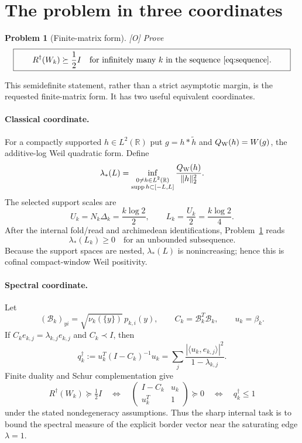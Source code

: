 \documentclass[11pt]{article}
\newtheorem{problem}{Problem}
\newcommand{\R}{\mathbb R}
\newcommand{\Rd}{R^{\dagger}}
\newcommand{\half}{\tfrac12}
\newcommand{\Ograde}{\textnormal{\small[O]}}
\begin{document}
\section{The problem in three coordinates}

\begin{problem}[Finite-matrix form]\label{prob:main}
\Ograde{} Prove
\[
\boxed{\qquad
\Rd(W_k)\succeq\frac12 I
\quad\text{for infinitely many }k
\text{ in the sequence \eqref{eq:sequence}.}\qquad}
\]
\end{problem}

This semidefinite statement, rather than a strict asymptotic margin,
is the requested finite-matrix form.  It has two useful equivalent
coordinates.

\paragraph{Classical coordinate.}
For a compactly supported $h\in L^2(\R)$ put
$g=h*\widetilde h$ and $Q_{\rm W}(h)=W(g)$, the additive-log Weil
quadratic form.  Define
\[
 \lambda_*(L)=
 \inf_{\substack{0\ne h\in L^2(\R)\\
 \operatorname{supp}h\subset[-L,L]}}
 \frac{Q_{\rm W}(h)}{\|h\|_2^2}.
\]
The selected support scales are
\begin{equation}\label{eq:support}
 U_k=N_k\Delta_k=\frac{k\log2}{2},\qquad
 L_k=\frac{U_k}{2}=\frac{k\log2}{4}.
\end{equation}
After the internal fold/read and archimedean identifications,
Problem~\ref{prob:main} reads
\[
 \lambda_*(L_k)\ge0
 \quad\text{for an unbounded subsequence.}
\]
Because the support spaces are nested, $\lambda_*(L)$ is
nonincreasing; hence this is cofinal compact-window Weil positivity.

\paragraph{Spectral coordinate.}
Let
\[
 (\mathcal B_k)_{y i}=\sqrt{\nu_k(\{y\})}\,p_{k,i}(y),\qquad
 C_k=\mathcal B_k^T\mathcal B_k,\qquad u_k=\beta_k .
\]
If $C_ke_{k,j}=\lambda_{k,j}e_{k,j}$ and $C_k\prec I$, then
\begin{equation}\label{eq:spectral}
 q_k^\dagger
 :=u_k^T(I-C_k)^{-1}u_k
 =\sum_j\frac{|\langle u_k,e_{k,j}\rangle|^2}
                 {1-\lambda_{k,j}}.
\end{equation}
Finite duality and Schur complementation give
\begin{equation}\label{eq:three-way}
 \Rd(W_k)\succeq\half I
 \quad\Longleftrightarrow\quad
 \begin{pmatrix}I-C_k&u_k\\u_k^T&1\end{pmatrix}\succeq0
 \quad\Longleftrightarrow\quad q_k^\dagger\le1
\end{equation}
under the stated nondegeneracy assumptions.  Thus the sharp internal
task is to bound the spectral measure of the explicit border vector
near the saturating edge $\lambda=1$.
\end{document}
